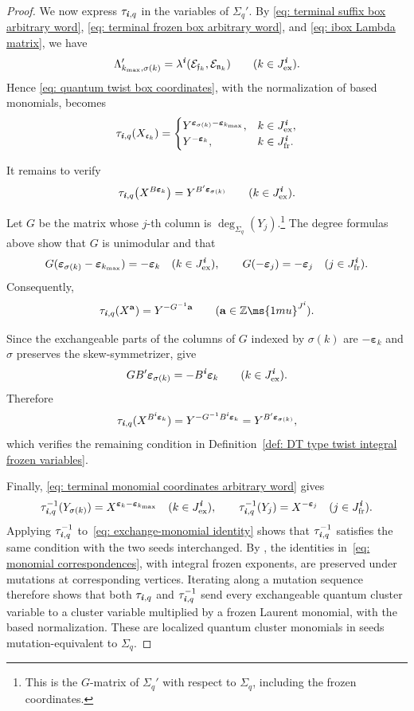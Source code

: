 \documentclass[12pt, leqno]{amsart}
\numberwithin{equation}{section}
\theoremstyle{plain}
\theoremstyle{definition}
\newcommand{\ex}{\mathrm{ex}}
\newcommand{\fr}{\mathrm{fr}}
\newcommand{\Z}{\mathbb{Z}\ms{1mu}}
\newcommand{\ve}{\boldsymbol{\varepsilon}}
\newcommand{\ii}{ \textbf{\textit{i}}}
\newcommand{\frakc}{\mathfrak{c}}
\newcommand{\frakf}{\mathfrak{f}}
\newcommand{\frakn}{\mathfrak{n}}
\newcommand{\bfa}{\mathbf{a}}
\newcommand{\calE}{\mathcal{E}}
\begin{document}
\begin{proof}
We now express $\tau_{\ii,q}$ in the variables of $\Sigma_q'$.
 By \eqref{eq: terminal suffix box arbitrary word},
\eqref{eq: terminal frozen box arbitrary word}, and
\eqref{eq: ibox Lambda matrix}, we have{}
\[
\Lambda'_{k_{\max},\sigma(k)}
=
\lambda^\ii(\calE_{\frakf_k},\calE_{\frakn_k})
\qquad(k\in J^\ii_\ex).
\]
Hence \eqref{eq: quantum twist box coordinates}, with the
normalization of based monomials, becomes
\begin{equation}
\tau_{\ii,q}(X_{\frakc_k})=
\begin{cases}
Y^{\ve_{\sigma(k)}-\ve_{k_{\max}}},&k\in J^\ii_\ex,\\
Y^{-\ve_k},&k\in J^\ii_{\fr}.
\end{cases}
\label{eq: terminal monomial coordinates arbitrary word}
\end{equation}

It remains to verify 
\begin{align} \label{eq: exchange-monomial identity}
\tau_{\ii,q}\bigl(X^{B\ve_k}\bigr)
=
Y^{B'\ve_{\sigma(k)}}
\qquad(k\in J^\ii_{\ex}).    
\end{align}


Let $G$ be the matrix whose $j$-th column is
$\deg_{\Sigma_q}(Y_j)$.\footnote{This is the $G$-matrix of
$\Sigma_q'$ with respect to $\Sigma_q$, including the frozen coordinates.}
The degree formulas above show that $G$ is unimodular and that
\[
G(\ve_{\sigma(k)}-\ve_{k_{\max}})=-\ve_k
\quad(k\in J^\ii_\ex),
\qquad
G(-\ve_j)=-\ve_j
\quad(j\in J^\ii_{\fr}).
\]
Consequently,
\[
\tau_{\ii,q}(X^{\bfa})=Y^{-G^{-1}\bfa}
\qquad(\bfa\in\Z^{J^\ii}).
\]

Since the exchangeable parts of the columns of $G$ indexed by 
$\sigma(k)$ are $-\ve_k$ and $\sigma$ preserves the
skew-symmetrizer,
\cite[equation~(2.4) and Lemma~2.15(1)]{KimuraQinWei} give
\[
GB'\ve_{\sigma(k)}=-B^\ii\ve_k
\qquad(k\in J^\ii_{\ex}).
\]
Therefore
\[
\tau_{\ii,q}(X^{B^\ii\ve_k})
=
Y^{-G^{-1}B^\ii\ve_k}
=
Y^{B'\ve_{\sigma(k)}},
\]
which verifies the remaining condition in
Definition~\ref{def: DT type twist integral frozen variables}.

Finally, \eqref{eq: terminal monomial coordinates arbitrary word}
gives
\begin{align} \label{eq: monomial correspondences}
\tau_{\ii,q}^{-1}(Y_{\sigma(k)})
=X^{\ve_k-\ve_{k_{\max}}}
\quad(k\in J^\ii_\ex),
\qquad
\tau_{\ii,q}^{-1}(Y_j)=X^{-\ve_j}
\quad(j\in J^\ii_{\fr}).    
\end{align}
Applying $\tau_{\ii,q}^{-1}$ to~\eqref{eq: exchange-monomial identity}
shows that $\tau_{\ii,q}^{-1}$ satisfies the same condition
with the two seeds interchanged. 
By \cite[Propositions~3.12 and~3.14]{KimuraQinWei}, the identities in~\eqref{eq: monomial correspondences},  with integral frozen exponents,
are preserved under mutations at corresponding vertices.
Iterating along a mutation sequence therefore shows that both
$\tau_{\ii,q}$ and $\tau_{\ii,q}^{-1}$ send every exchangeable
quantum cluster variable to a cluster variable multiplied by
a frozen Laurent monomial, with the based normalization.
These are localized quantum cluster monomials in seeds
mutation-equivalent to $\Sigma_q$.


\end{proof}
\end{document}
